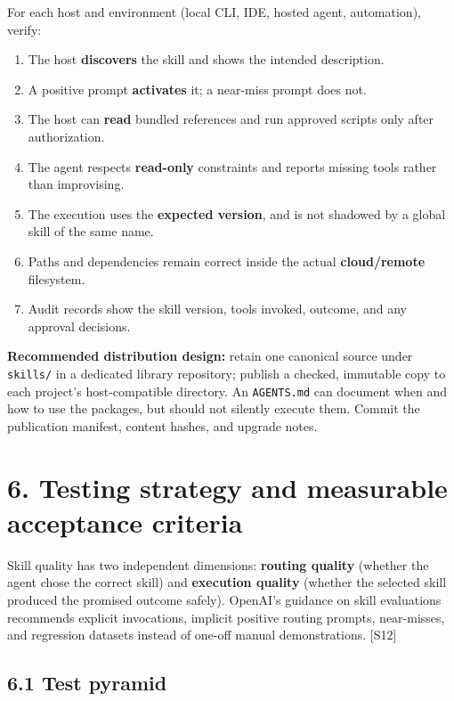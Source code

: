 \documentclass[
  10pt,
  letterpaper,
]{article}
\newcommand{\passthrough}[1]{#1}
\providecommand{\tightlist}{%
  \setlength{\itemsep}{0pt}\setlength{\parskip}{0pt}}
\begin{document}
For each host and environment (local CLI, IDE, hosted agent,
automation), verify:

\begin{enumerate}
\def\labelenumi{\arabic{enumi}.}
\tightlist
\item
  The host \textbf{discovers} the skill and shows the intended
  description.
\item
  A positive prompt \textbf{activates} it; a near-miss prompt does not.
\item
  The host can \textbf{read} bundled references and run approved scripts
  only after authorization.
\item
  The agent respects \textbf{read-only} constraints and reports missing
  tools rather than improvising.
\item
  The execution uses the \textbf{expected version}, and is not shadowed
  by a global skill of the same name.
\item
  Paths and dependencies remain correct inside the actual
  \textbf{cloud/remote} filesystem.
\item
  Audit records show the skill version, tools invoked, outcome, and any
  approval decisions.
\end{enumerate}

\textbf{Recommended distribution design:} retain one canonical source
under \passthrough{\lstinline!skills/!} in a dedicated library
repository; publish a checked, immutable copy to each project's
host-compatible directory. An \passthrough{\lstinline!AGENTS.md!} can
document when and how to use the packages, but should not silently
execute them. Commit the publication manifest, content hashes, and
upgrade notes.

\section{6. Testing strategy and measurable acceptance
criteria}\label{testing-strategy-and-measurable-acceptance-criteria}

Skill quality has two independent dimensions: \textbf{routing quality}
(whether the agent chose the correct skill) and \textbf{execution
quality} (whether the selected skill produced the promised outcome
safely). OpenAI's guidance on skill evaluations recommends explicit
invocations, implicit positive routing prompts, near-misses, and
regression datasets instead of one-off manual demonstrations. {[}S12{]}

\subsection{6.1 Test pyramid}\label{test-pyramid}
\end{document}
